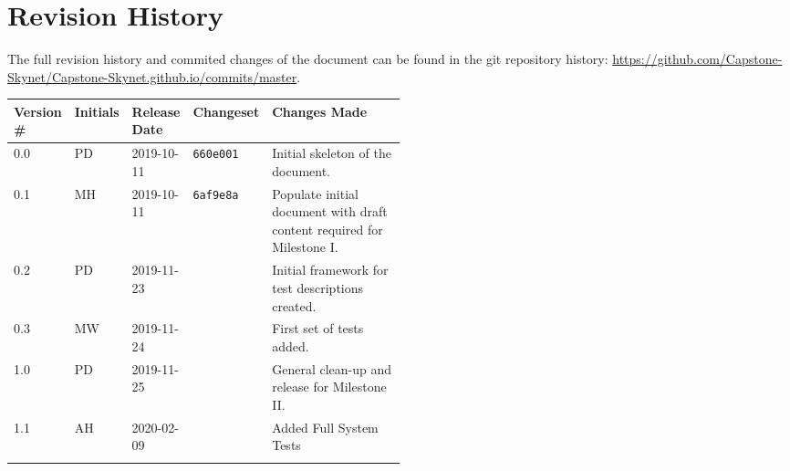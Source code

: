 \section*{Revision History}
The full revision history and commited changes of the document can be found in the git repository history: \href{https://github.com/Capstone-Skynet/Capstone-Skynet.github.io}{https://github.com/Capstone-Skynet/Capstone-Skynet.github.io/commits/master}.

\begin{table}[H]
\begin{tabular}{*{4}{l}p{0.5\linewidth}}
\hline
Version \# & Initials & Release Date & Changeset & Changes Made \\ \hline

0.0 & PD & 2019-10-11 & \texttt{660e001} & Initial skeleton of the document.\\
0.1 & MH & 2019-10-11 & \texttt{6af9e8a} & Populate initial document with draft content required for Milestone I.\\
0.2 & PD & 2019-11-23 & & Initial framework for test descriptions created.\\
0.3 & MW & 2019-11-24 & & First set of tests added.\\
1.0 & PD & 2019-11-25 & & General clean-up and release for Milestone II.\\
1.1 & AH & 2020-02-09 & & Added Full System Tests \\

 & & & \\ \hline
\end{tabular}
\end{table}